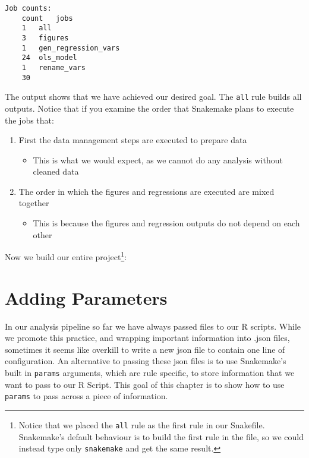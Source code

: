 \documentclass[]{book}
\newenvironment{Shaded}{\begin{snugshade}}{\end{snugshade}}
\newcommand{\KeywordTok}[1]{\textcolor[rgb]{0.13,0.29,0.53}{\textbf{{#1}}}}
\newcommand{\NormalTok}[1]{{#1}}
\providecommand{\tightlist}{%
  \setlength{\itemsep}{0pt}\setlength{\parskip}{0pt}}
\let\rmarkdownfootnote\footnote%
\def\footnote{\protect\rmarkdownfootnote}
\theoremstyle{definition}
\theoremstyle{definition}
\theoremstyle{definition}
\theoremstyle{remark}
\begin{document}
\begin{verbatim}
Job counts:
    count   jobs
    1   all
    3   figures
    1   gen_regression_vars
    24  ols_model
    1   rename_vars
    30
\end{verbatim}

The output shows that we have achieved our desired goal. The
\texttt{all} rule builds all outputs. Notice that if you examine the
order that Snakemake plans to execute the jobs that:

\begin{enumerate}
\def\labelenumi{\arabic{enumi}.}
\tightlist
\item
  First the data management steps are executed to prepare data

  \begin{itemize}
  \tightlist
  \item
    This is what we would expect, as we cannot do any analysis without
    cleaned data
  \end{itemize}
\item
  The order in which the figures and regressions are executed are mixed
  together

  \begin{itemize}
  \tightlist
  \item
    This is because the figures and regression outputs do not depend on
    each other
  \end{itemize}
\end{enumerate}

Now we build our entire project\footnote{Notice that we placed the
  \texttt{all} rule as the first rule in our Snakefile. Snakemake's
  default behaviour is to build the first rule in the file, so we could
  instead type only \texttt{snakemake} and get the same result.}:

\begin{Shaded}
\end{Shaded}

\chapter{Adding Parameters}\label{adding-parameters}

In our analysis pipeline so far we have always passed files to our R
scripts. While we promote this practice, and wrapping important
information into .json files, sometimes it seems like overkill to write
a new json file to contain one line of configuration. An alternative to
passing these json files is to use Snakemake's built in \texttt{params}
arguments, which are rule specific, to store information that we want to
pass to our R Script. This goal of this chapter is to show how to use
\texttt{params} to pass across a piece of information.
\end{document}
